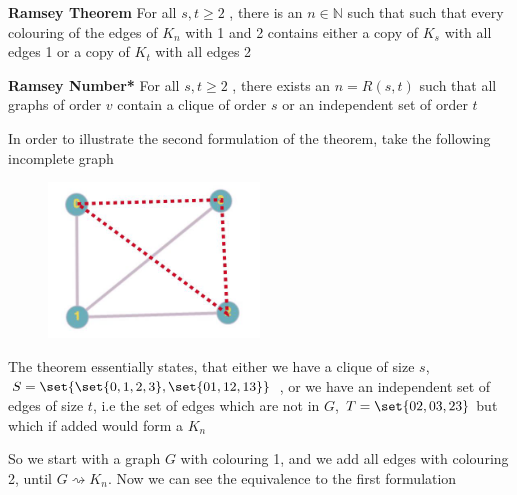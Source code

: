 \documentclass[english,course]{Notes}
\newcommand{\n}{\mathbb{N}}
\begin{document}
{{\begin{theorem}
\textbf{Ramsey Theorem} For all $s,t \geq 2$ , there is an $n \in \n$ such that such that every colouring of the edges of $K_{n}$ with 1 and 2 contains either a copy of $K_{s}$ with all edges 1 or a copy of $K_{t}$ with all edges 2
\end{theorem}

\begin{theorem}
\textbf{Ramsey Number*} For all $s,t \geq 2$ , there exists an $n=R(s,t)$ such that all graphs of order $v$ contain a clique of order $s$ or an independent set of order $t$
\end{theorem}

\par{In order to illustrate the second formulation of the theorem, take the following incomplete graph}




\begin{figure}[ht]
\centering
\includegraphics[width=0.5\textwidth]{ramsey.png}
\end{figure}

\par{The theorem essentially states, that either we have a clique of size $s$, $S = \set{\set{0,1,2,3},\set{01,12,13}}$ , or we have an independent set of edges of size $t$, i.e the set of edges which are not in $G$, $T = \set{02, 03, 23}$ but which if added would form a $K_{n}$}
\par{So we start with a graph $G$ with  colouring 1, and we add all edges with colouring 2, until $G \rightsquigarrow K_{n}$. Now we can see the equivalence to the first formulation}



}}
\end{document}
